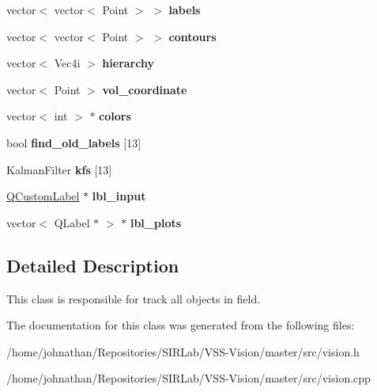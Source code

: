 \begin{DoxyCompactItemize}
\item 
vector$<$ vector$<$ Point $>$ $>$ {\bfseries labels}\hypertarget{classvision_a2a7fa3ec56b81484eb06c0f5c068365a}{}\label{classvision_a2a7fa3ec56b81484eb06c0f5c068365a}

\item 
vector$<$ vector$<$ Point $>$ $>$ {\bfseries contours}\hypertarget{classvision_a77ade58544c4db2587686e73d227cc37}{}\label{classvision_a77ade58544c4db2587686e73d227cc37}

\item 
vector$<$ Vec4i $>$ {\bfseries hierarchy}\hypertarget{classvision_a04a535405c5d7b076299073194f497b4}{}\label{classvision_a04a535405c5d7b076299073194f497b4}

\item 
vector$<$ Point $>$ {\bfseries vol\+\_\+coordinate}\hypertarget{classvision_a4f28ab3ac6e168aa977725da1973399b}{}\label{classvision_a4f28ab3ac6e168aa977725da1973399b}

\item 
vector$<$ int $>$ $\ast$ {\bfseries colors}\hypertarget{classvision_a7a1ac84ff70026be06b4ffe17fb0f3aa}{}\label{classvision_a7a1ac84ff70026be06b4ffe17fb0f3aa}

\item 
bool {\bfseries find\+\_\+old\+\_\+labels} \mbox{[}13\mbox{]}\hypertarget{classvision_a08b91dbb2384d4c6bd78560ec6621246}{}\label{classvision_a08b91dbb2384d4c6bd78560ec6621246}

\item 
Kalman\+Filter {\bfseries kfs} \mbox{[}13\mbox{]}\hypertarget{classvision_a76bf5d0bd645d4db2d9535bacae1284f}{}\label{classvision_a76bf5d0bd645d4db2d9535bacae1284f}

\item 
\hyperlink{classQCustomLabel}{Q\+Custom\+Label} $\ast$ {\bfseries lbl\+\_\+input}\hypertarget{classvision_ae925689fd0bd2eb2fcf2159e2f7b251e}{}\label{classvision_ae925689fd0bd2eb2fcf2159e2f7b251e}

\item 
vector$<$ Q\+Label $\ast$ $>$ $\ast$ {\bfseries lbl\+\_\+plots}\hypertarget{classvision_a4ec174995015376fcc9c15add83ed422}{}\label{classvision_a4ec174995015376fcc9c15add83ed422}

\end{DoxyCompactItemize}


\subsection{Detailed Description}
This class is responsible for track all objects in field. 

The documentation for this class was generated from the following files\+:\begin{DoxyCompactItemize}
\item 
/home/johnathan/\+Repositories/\+S\+I\+R\+Lab/\+V\+S\+S-\/\+Vision/master/src/vision.\+h\item 
/home/johnathan/\+Repositories/\+S\+I\+R\+Lab/\+V\+S\+S-\/\+Vision/master/src/vision.\+cpp\end{DoxyCompactItemize}
